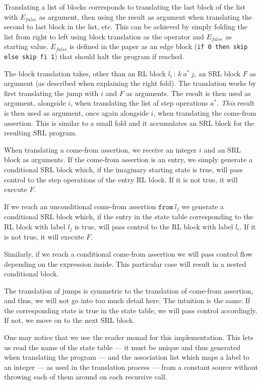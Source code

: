 Translating a list of blocks corresponds to translating the last block of the list with $E_{false}$ as argument, then using the result as argument when translating the second to last block in the list, etc. This can be achieved by simply folding the list from right to left using block translation as the operator and $E_{false}$ as starting value. $E_{false}$ is defined in the paper as an edge block (\texttt{if 0 then skip else skip fi 1}) that should halt the program if reached.

The block translation takes, other than an RL block $l_i \, : \, k \ a^* \ j$, an SRL block $F$ as argument (as described when explaining the right fold). The translation works by first translating the jump with $i$ and $F$ as arguments. The result is then used as argument, alongside $i$, when translating the list af step operations $a^*$. \textit{This} result is then used as argument, once again alongside $i$, when translating the come-from assertion. This is similar to a small fold and it accumulates an SRL block for the resulting SRL program.

When translating a come-from assertion, we receive an integer $i$ and an SRL block as arguments. If the come-from assertion is an entry, we simply generate a conditional SRL block which, if the imaginary starting state is true, will pass control to the step operations of the entry RL block. If it is not true, it will execute $F$.

If we reach an unconditional come-from assertion $\texttt{from} \ l_j$ we generate a conditional SRL block which, if the entry in the state table corresponding to the RL block with label $l_j$ is true, will pass control to the RL block with label $l_i$. If it is not true, it will execute $F$.

Similarly, if we reach a conditional come-from assertion we will pass control flow depending on the expression inside. This particular case will result in a nested conditional block.

The translation of jumps is symmetric to the translation of come-from assertion, and thus, we will not go into too much detail here. The intuition is the same: If the corresponding state is true in the state table, we will pass control accordingly. If not, we move on to the next SRL block.

One may notice that we use the reader monad for this implementation. This lets us read the name of the state table --- it must be unique and thus generated when translating the program --- and the association list which maps a label to an integer --- as used in the translation process --- from a constant source without throwing each of them around on each recursive call.

